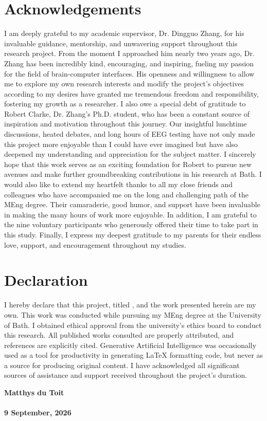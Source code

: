 {\let\clearpage\relax\chapter*{Acknowledgements}}
\bigskip


\noindent I am deeply grateful to my academic supervisor, Dr. Dingguo Zhang, for his invaluable guidance, mentorship, and unwavering support throughout this research project. From the moment I approached him nearly two years ago, Dr. Zhang has been incredibly kind, encouraging, and inspiring, fueling my passion for the field of brain-computer interfaces. His openness and willingness to allow me to explore my own research interests and modify the project's objectives according to my desires have granted me tremendous freedom and responsibility, fostering my growth as a researcher.
I also owe a special debt of gratitude to Robert Clarke, Dr. Zhang's Ph.D. student, who has been a constant source of inspiration and motivation throughout this journey. Our insightful lunchtime discussions, heated debates, and long hours of EEG testing have not only made this project more enjoyable than I could have ever imagined but have also deepened my understanding and appreciation for the subject matter. I sincerely hope that this work serves as an exciting foundation for Robert to pursue new avenues and make further groundbreaking contributions in his research at Bath.
I would also like to extend my heartfelt thanks to all my close friends and colleagues who have accompanied me on the long and challenging path of the MEng degree. Their camaraderie, good humor, and support have been invaluable in making the many hours of work more enjoyable. In addition, I am grateful to the nine voluntary participants who generously offered their time to take part in this study.
Finally, I express my deepest gratitude to my parents for their endless love, support, and encouragement throughout my studies.



\vspace{30mm}
{\let\clearpage\relax\chapter*{Declaration}}
\bigskip


\noindent I hereby declare that this project, titled , and the work presented herein are my own. This work was conducted while pursuing my MEng degree at the University of Bath. I obtained ethical approval from the university's ethics board to conduct this research. All published works consulted are properly attributed, and references are explicitly cited. Generative Artificial Intelligence was occasionally used as a tool for productivity in generating LaTeX formatting code, but never as a source for producing original content. I have acknowledged all significant sources of assistance and support received throughout the project's duration.


\bigskip
\bigskip

\noindent \textbf{Matthys du Toit}
\\\\
\noindent \textbf{9 September, 2026}